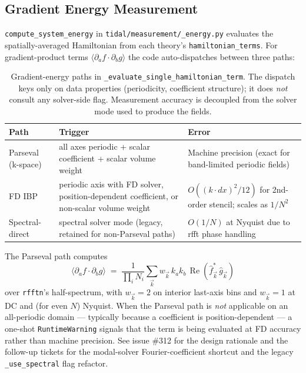 \subsection{Gradient Energy Measurement}
\label{sec:gradient-energy-measurement}

\texttt{compute\_system\_energy} in \texttt{tidal/measurement/\_energy.py} evaluates the spatially-averaged Hamiltonian from each theory's \texttt{hamiltonian\_terms}. For gradient-product terms $\langle \partial_a f \cdot \partial_b g \rangle$ the code auto-dispatches between three paths:

\begin{table}[htbp]
\centering
\caption{Gradient-energy paths in \texttt{\_evaluate\_single\_hamiltonian\_term}. The dispatch keys only on data properties (periodicity, coefficient structure); it does \emph{not} consult any solver-side flag. Measurement accuracy is decoupled from the solver mode used to produce the fields.}
\label{tab:gradient-energy-paths}
\begin{tabular}{@{}p{}p{}p{}@{}}
\toprule
Path & Trigger & Error \\
\midrule
Parseval (k-space) & all axes periodic + scalar coefficient + scalar volume weight & Machine precision (exact for band-limited periodic fields) \\
FD IBP & periodic axis with FD solver, position-dependent coefficient, or non-scalar volume weight & $O((k \cdot dx)^2 / 12)$ for 2nd-order stencil; scales as $1/N^2$ \\
Spectral-direct & spectral solver mode (legacy, retained for non-Parseval paths) & $O(1/N)$ at Nyquist due to rfft phase handling \\
\bottomrule
\end{tabular}
\end{table}

The Parseval path computes
\[
\langle \partial_a f \cdot \partial_b g \rangle \;=\; \frac{1}{\prod_i N_i} \sum_{\vec{k}} w_{\vec{k}}\, k_a k_b\, \operatorname{Re}(\hat{f}^*_{\vec{k}}\, \hat{g}_{\vec{k}})
\]
over \texttt{rfftn}'s half-spectrum, with $w_{\vec{k}} = 2$ on interior last-axis bins and $w_{\vec{k}} = 1$ at DC and (for even $N$) Nyquist. When the Parseval path is \emph{not} applicable on an all-periodic domain --- typically because a coefficient is position-dependent --- a one-shot \texttt{RuntimeWarning} signals that the term is being evaluated at FD accuracy rather than machine precision. See issue \#312 for the design rationale and the follow-up tickets for the modal-solver Fourier-coefficient shortcut and the legacy \texttt{\_use\_spectral} flag refactor.

